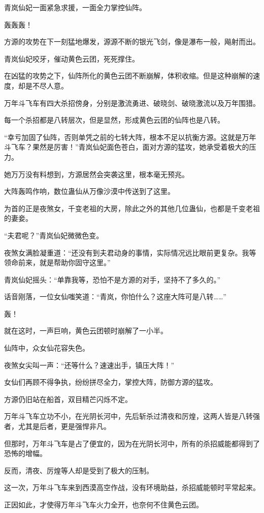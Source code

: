 \begin{this_body}
青岚仙妃一面紧急求援，一面全力掌控仙阵。

轰轰轰！

方源的攻势在下一刻猛地爆发，源源不断的银光飞剑，像是瀑布一般，飚射而出。

青岚仙妃咬牙，催动黄色云团，死死撑住。

在凶猛的攻势之下，仙阵所化的黄色云团不断崩解，体积收缩。但是这种崩解的速度，却是不尽人意。

万年斗飞车有四大杀招傍身，分别是激流勇进、破晓剑、破晓激流以及万年围猎。

每一个杀招都是八转层次，但是显然，形成黄色云团的仙阵也是八转。

“幸亏加固了仙阵，否则单凭之前的七转大阵，根本不足以抗衡方源。这就是万年斗飞车？果然是厉害！”青岚仙妃面色苍白，面对方源的猛攻，她承受着极大的压力。

她万万没有料想到，方源居然会突袭这里，根本毫无预兆。

大阵轰鸣作响，数位蛊仙从万像沙漠中传送到了这里。

为首的正是夜煞女，千变老祖的大房，除此之外的其他几位蛊仙，也都是千变老祖的妻妾。

“夫君呢？”青岚仙妃微微色变。

夜煞女满脸凝重道：“还没有到夫君动身的事情，实际情况远比眼前更复杂。我等领命前来，就是帮助你固守这里。”

青岚仙妃摇头：“单靠我等，恐怕不是方源的对手，坚持不了多久的。”

话音刚落，一位女仙嗤笑道：“青岚，你怕什么？这座大阵可是八转……”

轰！

就在这时，一声巨响，黄色云团顿时崩解了一小半。

仙阵中，众女仙花容失色。

夜煞女尖叫一声：“还等什么？速速出手，镇压大阵！”

女仙们再顾不得争执，纷纷拼尽全力，掌控大阵，防御方源的猛攻。

方源仍旧站在船首，双目精芒闪烁不定。

万年斗飞车立功不小，在光阴长河中，先后斩杀过清夜和厉煌，这两人皆是八转强者，尤其是后者，更是强悍非凡。

但那时，万年斗飞车是占了便宜的，因为在光阴长河中，所有的杀招威能都得到了恐怖的增幅。

反而，清夜、厉煌等人却是受到了极大的压制。

这一次，万年斗飞车来到西漠高空作战，没有环境助益，杀招威能顿时平常起来。

正因如此，才使得万年斗飞车火力全开，也奈何不住黄色云团。


\end{this_body}
